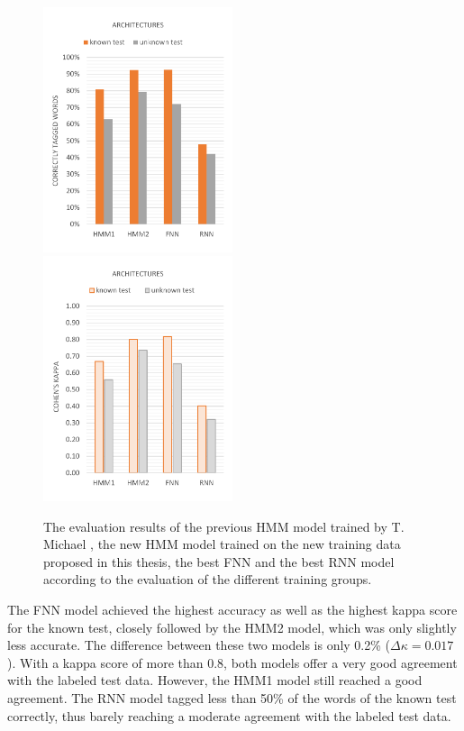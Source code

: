 \begin{figure}[H]
\centering
{}
{\includegraphics[width=0.495\textwidth]{images/comparison}}
{\includegraphics[width=0.495\textwidth]{images/comparison_k}}
\vspace{1em}
\caption[Comparison of all Architectures]{The evaluation results of the previous HMM model trained by T. Michael \cite{michael2016}, the new HMM model trained on the new training data proposed in this thesis, the best FNN and the best RNN model according to the evaluation of the different training groups.}
\label{f.evaluation.comparison}
\end{figure}

The FNN model achieved the highest accuracy as well as the highest kappa score for the known test, closely followed by the HMM2 model, which was only slightly less accurate. The difference between these two models is only 0.2\% ($\Delta\kappa=0.017$). With a kappa score of more than 0.8, both models offer a very good agreement with the labeled test data. However, the HMM1 model still reached a good agreement. The RNN model tagged less than 50\% of the words of the known test correctly, thus barely reaching a moderate agreement with the labeled test data.

